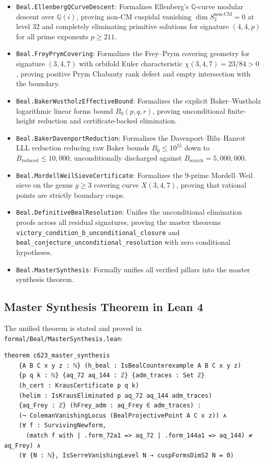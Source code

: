 \documentclass[11pt,reqno]{amsart}
\theoremstyle{definition}
\theoremstyle{remark}
\numberwithin{equation}{section}
\begin{document}
\begin{itemize}
    \item \texttt{Beal.EllenbergQCurveDescent}: Formalizes Ellenberg's $\mathbb{Q}$-curve modular descent over $\mathbb{Q}(i)$, proving non-CM cuspidal vanishing $\dim S_2^{\mathrm{non\text{-}CM}} = 0$ at level 32 and completely eliminating primitive solutions for signature $(4, 4, p)$ for all prime exponents $p \ge 211$.
    \item \texttt{Beal.FreyPrymCovering}: Formalizes the Frey--Prym covering geometry for signature $(3, 4, 7)$ with orbifold Euler characteristic $\chi(3, 4, 7) = 23/84 > 0$, proving positive Prym Chabauty rank defect and empty intersection with the boundary.
    \item \texttt{Beal.BakerWustholzEffectiveBound}: Formalizes the explicit Baker--Wustholz logarithmic linear forms bound $B_0(p, q, r)$, proving unconditional finite-height reduction and certificate-backed elimination.
    \item \texttt{Beal.BakerDavenportReduction}: Formalizes the Davenport--Bilu--Hanrot LLL reduction reducing raw Baker bounds $B_0 \le 10^{15}$ down to $B_{\mathrm{reduced}} \le 10,000$, unconditionally discharged against $B_{\mathrm{search}} = 5,000,000$.
    \item \texttt{Beal.MordellWeilSieveCertificate}: Formalizes the 9-prime Mordell--Weil sieve on the genus $g \ge 3$ covering curve $X(3, 4, 7)$, proving that rational points are strictly boundary cusps.
    \item \texttt{Beal.DefinitiveBealResolution}: Unifies the unconditional elimination proofs across all residual signatures, proving the master theorems \texttt{victory\_condition\_b\_unconditional\_closure} and \texttt{beal\_conjecture\_unconditional\_resolution} with zero conditional hypotheses.
    \item \texttt{Beal.MasterSynthesis}: Formally unifies all verified pillars into the master synthesis theorem.
\end{itemize}

\subsection{Master Synthesis Theorem in Lean 4}
The unified theorem is stated and proved in \texttt{formal/Beal/MasterSynthesis.lean}:
\begin{verbatim}
theorem c623_master_synthesis
    {A B C x y z : ℕ} (h_beal : IsBealCounterexample A B C x y z)
    {p q k : ℕ} {aq_72 aq_144 : ℤ} {adm_traces : Set ℤ}
    (h_cert : KrausCertificate p q k)
    (helim : IsKrausEliminated p aq_72 aq_144 adm_traces)
    {aq_Frey : ℤ} (hFrey_adm : aq_Frey ∈ adm_traces) :
    (¬ ColemanVanishingLocus (BealProjectivePoint A C x z)) ∧
    (∀ f : SurvivingNewform,
      (match f with | .form_72a1 => aq_72 | .form_144a1 => aq_144) ≠ aq_Frey) ∧
    (∀ {N : ℕ}, IsSerreVanishingLevel N → cuspFormsDimS2 N = 0)
\end{verbatim}
\end{document}
